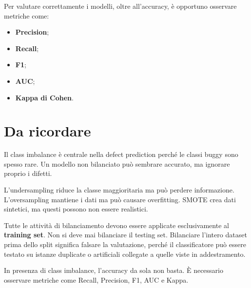 Per valutare correttamente i modelli, oltre all'accuracy, è opportuno osservare metriche come:

\begin{itemize}
    \item \textbf{Precision};
    \item \textbf{Recall};
    \item \textbf{F1};
    \item \textbf{AUC};
    \item \textbf{Kappa di Cohen}.
\end{itemize}

\section{Da ricordare}

\begin{notaesame}
Il class imbalance è centrale nella defect prediction perché le classi buggy sono spesso rare. Un modello non bilanciato può sembrare accurato, ma ignorare proprio i difetti.
\end{notaesame}

\begin{notaesame}
L'undersampling riduce la classe maggioritaria ma può perdere informazione. L'oversampling mantiene i dati ma può causare overfitting. SMOTE crea dati sintetici, ma questi possono non essere realistici.
\end{notaesame}

\begin{notaesame}
Tutte le attività di bilanciamento devono essere applicate esclusivamente al \textbf{training set}. Non si deve mai bilanciare il testing set. Bilanciare l'intero dataset prima dello split significa falsare la valutazione, perché il classificatore può essere testato su istanze duplicate o artificiali collegate a quelle viste in addestramento.
\end{notaesame}

\begin{notaesame}
In presenza di class imbalance, l'accuracy da sola non basta. È necessario osservare metriche come Recall, Precision, F1, AUC e Kappa.
\end{notaesame}